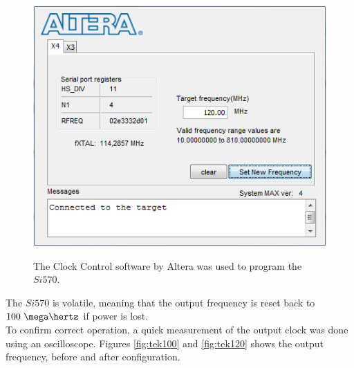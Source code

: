 \documentclass[main.tex]{subfiles}
\begin{document}
\begin{figure}[ht] %
\begin{center}
\includegraphics[scale=1]{../img/clk_cont120}  \\[0.1 cm]
\caption{The Clock Control software by Altera was used to program the $Si570$.}
\label{fig:clk_cont120}
\end{center}
\end{figure} 

The $Si570$ is volatile, meaning that the output frequency is reset back to $100~\mega\hertz$ if power is lost. \\
To confirm correct operation, a quick measurement of the output clock was done using an oscilloscope. Figures \ref{fig:tek100} and \ref{fig:tek120} shows the output frequency, before and after configuration.\\
\end{document}
